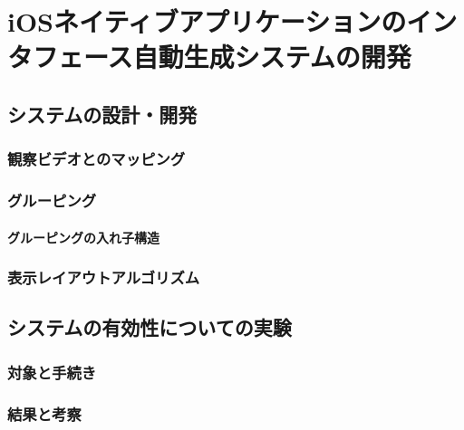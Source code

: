 \chapter{iOSネイティブアプリケーションのインタフェース自動生成システムの開発}
\label{chap:impl}

\section{システムの設計・開発}

\subsection{観察ビデオとのマッピング}

\subsection{グルーピング}
\subsubsection{グルーピングの入れ子構造}

\subsection{表示レイアウトアルゴリズム}

\section{システムの有効性についての実験}

\subsection{対象と手続き}

\subsection{結果と考察}